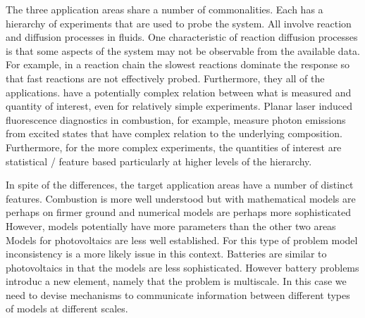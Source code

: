 \documentclass[11pt]{article}
\newcommand{\MarginPar}[1]{\marginpar{%
\vskip-\baselineskip %
\raggedright\tiny\sffamily
\hrule\smallskip{\color{red}#1}\par\smallskip\hrule}}
\begin{document}
The three application areas share a number of commonalities.
Each has a hierarchy of experiments that are used to probe the system.
All involve reaction and diffusion processes in fluids.
One characteristic of reaction diffusion processes is that some aspects of the system
may not be observable from the available data. For example, in a reaction chain the slowest
reactions dominate the response so that fast reactions are not effectively probed.
Furthermore, they all of the applications.
have a potentially complex relation between what is measured and quantity of interest,
even for relatively simple experiments. 
Planar laser induced fluorescence diagnostics in combustion, for example, 
measure photon emissions from excited states that have complex relation to the underlying
composition.
Furthermore, for the more complex experiments, the
quantities of interest are statistical / feature based
particularly at higher levels of the hierarchy.
\MarginPar{from discussion of 5/13 this my be too hard}

In spite of the differences, the target application areas have a number
of distinct features.
Combustion is more well understood but with mathematical models are perhaps on firmer ground
and numerical models are perhaps more sophisticated
However, models potentially have more parameters than the other two areas
Models for photovoltaics are less well established.
For this type of problem 
model inconsistency is a more likely issue in this context.
Batteries are similar to photovoltaics
in that the models are less sophisticated. However battery problems introduc a 
new element, namely that the problem is multiscale.
In this case we need to devise mechanisms to communicate information
between different types of models at different scales.
\end{document}
